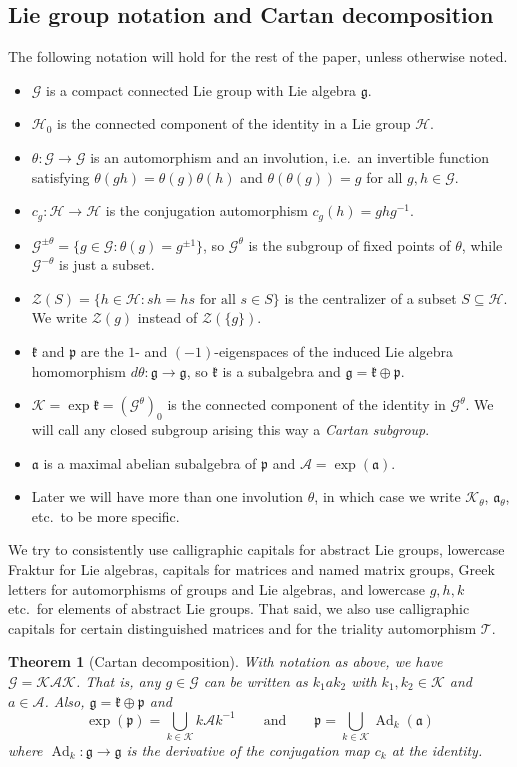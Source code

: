 \documentclass[reqno]{amsart}
\newtheorem{theorem}{Theorem}[section]
\theoremstyle{definition} \newtheorem{example}[theorem]{Example}
\DeclareMathOperator{\Ad}{Ad}
\newcommand{\p}{\mathfrak{p}}
\newcommand{\G}{\mathcal{G}}
\newcommand{\g}{\mathfrak{g}}
\renewcommand{\H}{\mathcal{H}}
\newcommand{\K}{\mathcal{K}}
\renewcommand{\k}{\mathfrak{k}}
\newcommand{\A}{\mathcal{A}}
\renewcommand{\a}{\mathfrak{a}}
\newcommand{\T}{\mathcal{T}}
\newcommand{\Z}{\mathcal{Z}}
\begin{document}
\subsection{Lie group notation and Cartan decomposition} \label{subsec:cartan}
The following notation will hold for the rest of the paper, unless otherwise noted.
\begin{itemize}
\item $\G$ is a compact connected Lie group with Lie algebra $\g$.
\item $\H_0$ is the connected component of the identity in a Lie group $\H$.
\item $\theta : \G \to \G$ is an automorphism and an involution, i.e.\ an invertible function satisfying $\theta(gh) = \theta(g)\theta(h)$ and $\theta(\theta(g)) = g$ for all $g,h \in \G$.
\item $c_g : \H \to \H$ is the conjugation automorphism $c_g(h) = ghg^{-1}$.
\item $\G^{\pm \theta} = \{g \in \G : \theta(g) = g^{\pm 1}\}$, so $\G^\theta$ is the subgroup of fixed points of $\theta$, while $\G^{-\theta}$ is just a subset. 
\item $\Z(S) = \{h \in \H : sh = hs \text{ for all $s \in S$}\}$ is the centralizer of a subset $S \subseteq \H$. We write $\Z(g)$ instead of $\Z(\{g\})$.
\item $\k$ and $\p$ are the $1$- and $(-1)$-eigenspaces of the induced Lie algebra homomorphism $d\theta : \g \to \g$, so $\k$ is a subalgebra and $\g = \k \oplus \p$. 
\item $\K = \exp \k = (\G^\theta)_0$ is the connected component of the identity in $\G^\theta$. We will call any closed subgroup arising this way a \emph{Cartan subgroup}.
\item $\a$ is a maximal abelian subalgebra of $\p$ and $\A = \exp(\a)$.
\item Later we will have more than one involution $\theta$, in which case we write $\K_\theta$, $\a_\theta$, etc.\ to be more specific.
\end{itemize}
We try to consistently use calligraphic capitals for abstract Lie groups, lowercase Fraktur for Lie algebras, capitals for matrices and named matrix groups, Greek letters for automorphisms of groups and Lie algebras, and lowercase $g,h,k$ etc.\ for elements of abstract Lie groups. That said, we also use calligraphic capitals for certain distinguished matrices and for the triality automorphism $\T$.

\begin{theorem}[Cartan decomposition] \cite[Ch.\ V, Theorem 6.7]{helgason} \label{thm:cartan}
With notation as above,  we have $\G = \K\A\K$. That is, any $g \in \G$ can be written as $k_1 a k_2$ with $k_1,k_2 \in \K$ and $a \in \A$. Also, $\g = \k \oplus \p$ and 
\begin{equation*}
\exp(\p) = \bigcup_{k \in \K} k\A k^{-1} \qquad \text{and} \qquad \p = \bigcup_{k \in \K} \Ad_k(\a)
\end{equation*}
where $\Ad_k : \g \to \g$ is the derivative of the conjugation map $c_k$ at the identity.
\end{theorem}
\end{document}
